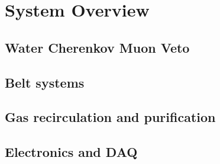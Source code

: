 \section{System Overview}


\subsection{Water Cherenkov Muon Veto}


\subsection{Belt systems}


\subsection{Gas recirculation and purification}


\subsection{Electronics and DAQ}

